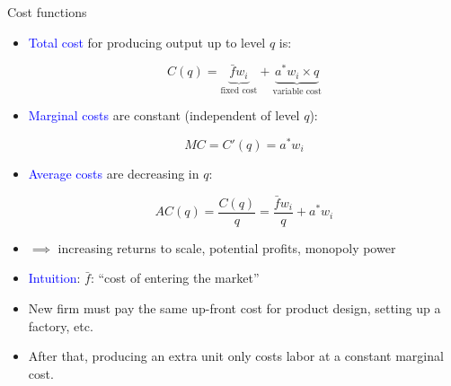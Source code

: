\documentclass[notes,11pt, aspectratio=169, xcolor=table]{beamer}
\newcommand{\blue}[1]{\textcolor{blue}{#1}}
\begin{document}
\begin{frame}{Cost functions}

\begin{itemize}
    \item \blue{Total cost} for producing output up to level $q$ is:

    \begin{equation*}
        C(q) = \underbrace{\bar{f}w_i}
        _{\text{fixed cost}} + \underbrace{a^*w_i \times q}_{\text{variable cost}}
    \end{equation*}

    \item<2-> \blue{Marginal costs} are constant (independent of level $q$):

    \begin{equation*}
        MC = C'(q) = a^* w_i
    \end{equation*}

    \item<3-> \blue{Average costs} are decreasing in $q$:

    \begin{equation*}
        AC(q) = \frac{C(q)}{q} = \frac{\bar{f}w_i}{q} + a^*w_i
    \end{equation*}    

    \item<4-> $\implies$ increasing returns to scale, potential profits, monopoly power

    \item<5-> \blue{Intuition}: $\bar{f}$: ``cost of entering the market''
    
    \item<6-> New firm must pay the same up-front cost for product design, setting up a factory, etc.
    
    \item<7-> After that, producing an extra unit only costs labor at a constant marginal cost.

    
\end{itemize}
    
\end{frame}
\end{document}
